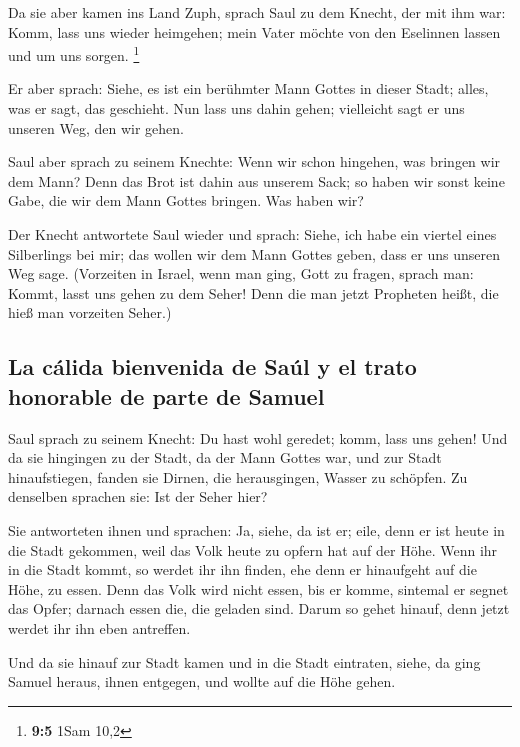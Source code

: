  Da sie aber kamen ins Land Zuph, sprach Saul zu dem
Knecht, der mit ihm war: Komm, lass uns wieder heimgehen; mein Vater
möchte von den Eselinnen lassen und um uns sorgen. \footnote{\textbf{9:5}
  1Sam 10,2}

 Er aber sprach: Siehe, es ist ein berühmter Mann Gottes
in dieser Stadt; alles, was er sagt, das geschieht. Nun lass uns dahin
gehen; vielleicht sagt er uns unseren Weg, den wir gehen.

 Saul aber sprach zu seinem Knechte: Wenn wir schon
hingehen, was bringen wir dem Mann? Denn das Brot ist dahin aus unserem
Sack; so haben wir sonst keine Gabe, die wir dem Mann Gottes bringen.
Was haben wir?

 Der Knecht antwortete Saul wieder und sprach: Siehe, ich
habe ein viertel eines Silberlings bei mir; das wollen wir dem Mann
Gottes geben, dass er uns unseren Weg sage.  (Vorzeiten in
Israel, wenn man ging, Gott zu fragen, sprach man: Kommt, lasst uns
gehen zu dem Seher! Denn die man jetzt Propheten heißt, die hieß man
vorzeiten Seher.)

\hypertarget{la-cuxe1lida-bienvenida-de-sauxfal-y-el-trato-honorable-de-parte-de-samuel}{%
\subsection{La cálida bienvenida de Saúl y el trato honorable de parte
de
Samuel}\label{la-cuxe1lida-bienvenida-de-sauxfal-y-el-trato-honorable-de-parte-de-samuel}}

 Saul sprach zu seinem Knecht: Du hast wohl geredet;
komm, lass uns gehen! Und da sie hingingen zu der Stadt, da der Mann
Gottes war,  und zur Stadt hinaufstiegen, fanden sie
Dirnen, die herausgingen, Wasser zu schöpfen. Zu denselben sprachen sie:
Ist der Seher hier?

 Sie antworteten ihnen und sprachen: Ja, siehe, da ist
er; eile, denn er ist heute in die Stadt gekommen, weil das Volk heute
zu opfern hat auf der Höhe.  Wenn ihr in die Stadt kommt,
so werdet ihr ihn finden, ehe denn er hinaufgeht auf die Höhe, zu essen.
Denn das Volk wird nicht essen, bis er komme, sintemal er segnet das
Opfer; darnach essen die, die geladen sind. Darum so gehet hinauf, denn
jetzt werdet ihr ihn eben antreffen.

 Und da sie hinauf zur Stadt kamen und in die Stadt
eintraten, siehe, da ging Samuel heraus, ihnen entgegen, und wollte auf
die Höhe gehen.

